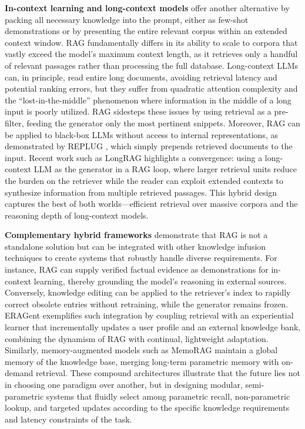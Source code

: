 \documentclass[11pt,a4paper]{article}
\begin{document}
\textbf{In-context learning and long-context models} offer another alternative by packing all necessary knowledge into the prompt, either as few-shot demonstrations or by presenting the entire relevant corpus within an extended context window. RAG fundamentally differs in its ability to scale to corpora that vastly exceed the model's maximum context length, as it retrieves only a handful of relevant passages rather than processing the full database. Long-context LLMs can, in principle, read entire long documents, avoiding retrieval latency and potential ranking errors, but they suffer from quadratic attention complexity and the ``lost-in-the-middle'' phenomenon where information in the middle of a long input is poorly utilized. RAG sidesteps these issues by using retrieval as a pre-filter, feeding the generator only the most pertinent snippets. Moreover, RAG can be applied to black-box LLMs without access to internal representations, as demonstrated by REPLUG \cite{arxiv:2301.12652v4}, which simply prepends retrieved documents to the input. Recent work such as LongRAG \cite{arxiv:2406.15319v3} highlights a convergence: using a long-context LLM as the generator in a RAG loop, where larger retrieval units reduce the burden on the retriever while the reader can exploit extended contexts to synthesize information from multiple retrieved passages. This hybrid design captures the best of both worlds---efficient retrieval over massive corpora and the reasoning depth of long-context models.

\textbf{Complementary hybrid frameworks} demonstrate that RAG is not a standalone solution but can be integrated with other knowledge infusion techniques to create systems that robustly handle diverse requirements. For instance, RAG can supply verified factual evidence as demonstrations for in-context learning, thereby grounding the model's reasoning in external sources. Conversely, knowledge editing can be applied to the retriever's index to rapidly correct obsolete entries without retraining, while the generator remains frozen. ERAGent \cite{arxiv:2405.06683v1} exemplifies such integration by coupling retrieval with an experiential learner that incrementally updates a user profile and an external knowledge bank, combining the dynamism of RAG with continual, lightweight adaptation. Similarly, memory-augmented models such as MemoRAG \cite{arxiv:2409.05591v2} maintain a global memory of the knowledge base, merging long-term parametric memory with on-demand retrieval. These compound architectures illustrate that the future lies not in choosing one paradigm over another, but in designing modular, semi-parametric systems that fluidly select among parametric recall, non-parametric lookup, and targeted updates according to the specific knowledge requirements and latency constraints of the task.
\end{document}

